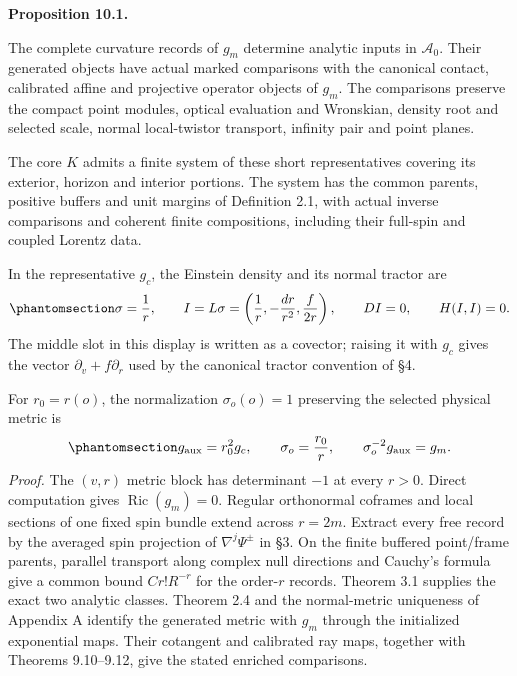 \documentclass[
  english,
  11pt,
  reqno]{amsart}
\makeatletter
\newcommand{\pandocstatementheading}[1]{%
  \par\addpenalty{\@beginparpenalty}%
  \addvspace{.5\baselineskip plus .2\baselineskip minus .2\baselineskip}%
  {\normalfont\bfseries #1\par}%
  \nobreak\@afterindenttrue\@afterheading
}
\makeatother
\begin{document}
\pandocstatementheading{\protect{}\label{prop:gg-schwarzschild-main-comparison}Proposition 10.1.}

The complete curvature records of \(g_m\) determine analytic inputs in
\(\mathcal A_0\). Their generated objects have actual marked comparisons
with the canonical contact, calibrated affine and projective operator
objects of \(g_m\). The comparisons preserve the compact point modules,
optical evaluation and Wronskian, density root and selected scale,
normal local-twistor transport, infinity pair and point planes.

The core \(K\) admits a finite system of these short representatives
covering its exterior, horizon and interior portions. The system has the
common parents, positive buffers and unit margins of Definition 2.1,
with actual inverse comparisons and coherent finite compositions,
including their full-spin and coupled Lorentz data.

In the representative \(g_c\), the Einstein density and its normal
tractor are
\begin{equation}\protect\phantomsection\label{eq:gg-schwarzschild-main-scale}{
 \sigma=\frac1r,\qquad
 I=L\sigma=\left(\frac1r,-\frac{dr}{r^2},\frac{f}{2r}\right),
 \qquad DI=0,\qquad H(I,I)=0.
}\end{equation} The middle slot in this display is written as a
covector; raising it with \(g_c\) gives the vector
\(\partial_v+f\partial_r\) used by the canonical tractor convention of
§4.

For \(r_0=r(o)\), the normalization \(\sigma_o(o)=1\) preserving the
selected physical metric is
\begin{equation}\protect\phantomsection\label{eq:gg-schwarzschild-main-normalization}{
 g_{\rm aux}=r_0^2g_c,\qquad \sigma_o=\frac{r_0}{r},\qquad
 \sigma_o^{-2}g_{\rm aux}=g_m.
}\end{equation} \emph{Proof.} The \((v,r)\) metric block has determinant
\(-1\) at every \(r>0\). Direct computation gives
\(\operatorname{Ric}(g_m)=0\). Regular orthonormal coframes and local
sections of one fixed spin bundle extend across \(r=2m\). Extract every
free record by the averaged spin projection of \(\nabla^j\Psi^\pm\) in
§3. On the finite buffered point/frame parents, parallel transport along
complex null directions and Cauchy's formula give a common bound
\(Cr!R^{-r}\) for the order-\(r\) records. Theorem 3.1 supplies the
exact two analytic classes. Theorem 2.4 and the normal-metric uniqueness
of Appendix A identify the generated metric with \(g_m\) through the
initialized exponential maps. Their cotangent and calibrated ray maps,
together with Theorems 9.10--9.12, give the stated enriched comparisons.
\end{document}
